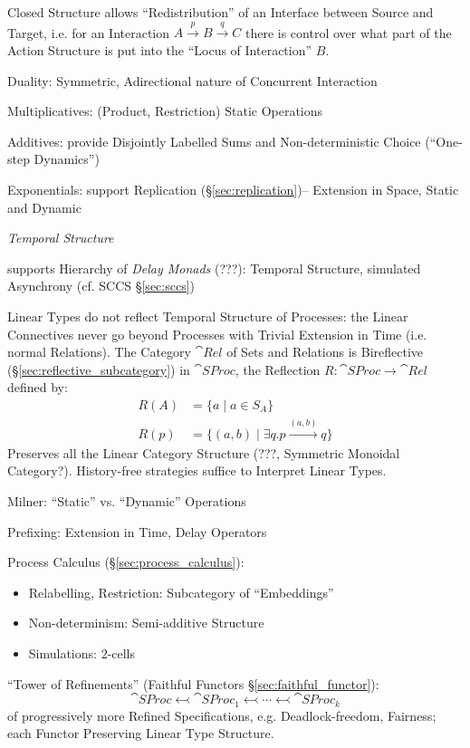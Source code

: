 Closed Structure allows ``Redistribution'' of an Interface between
Source and Target, i.e. for an Interaction $A \xrightarrow{p} B
\xrightarrow{q} C$ there is control over what part of the Action
Structure is put into the ``Locus of Interaction'' $B$.

Duality: Symmetric, Adirectional nature of Concurrent Interaction

Multiplicatives: (Product, Restriction) Static Operations

Additives: provide Disjointly Labelled Sums and Non-deterministic
Choice (``One-step Dynamics'')

Exponentials: support Replication (\S\ref{sec:replication})--
Extension in Space, Static and Dynamic


\emph{Temporal Structure}

supports Hierarchy of \emph{Delay Monads} (???): Temporal Structure,
simulated Asynchrony (cf. SCCS \S\ref{sec:sccs}) %

Linear Types do not reflect Temporal Structure of Processes: the
Linear Connectives never go beyond Processes with Trivial Extension in
Time (i.e. normal Relations). The Category $\cat{Rel}$ of Sets and
Relations is Bireflective (\S\ref{sec:reflective_subcategory}) in
$\cat{SProc}$, the Reflection $R : \cat{SProc} \rightarrow \cat{Rel}$
defined by:
\begin{align*}
  R(A) &= \{a \mid a \in S_A\} \\
  R(p) &= \{(a,b) \mid \exists q.p \xrightarrow{(a,b)} q\}
\end{align*}
Preserves all the Linear Category Structure (???, Symmetric Monoidal
Category?). History-free strategies suffice to Interpret Linear Types.

Milner: ``Static'' vs. ``Dynamic'' Operations

Prefixing: Extension in Time, Delay Operators

Process Calculus (\S\ref{sec:process_calculus}):
\begin{itemize}
  \item Relabelling, Restriction: Subcategory of ``Embeddings''
  \item Non-determinism: Semi-additive Structure
  \item Simulations: $2$-cells
\end{itemize}


``Tower of Refinements'' (Faithful Functors
\S\ref{sec:faithful_functor}):
\[
  \cat{SProc} \leftarrowtail \cat{SProc}_1 \leftarrowtail
    \cdots \leftarrowtail \cat{SProc}_k
\]
of progressively more Refined Specifications, e.g. Deadlock-freedom,
Fairness; each Functor Preserving Linear Type Structure.

